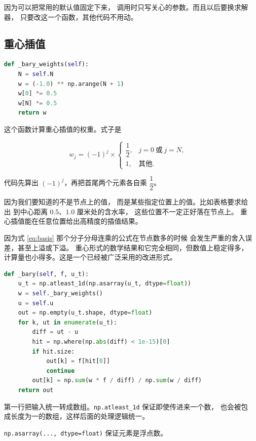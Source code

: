 因为可以把常用的默认值固定下来，
调用时只写关心的参数。而且以后要换求解器，
只要改这一个函数，其他代码不用动。

\subsection{重心插值}

\begin{lstlisting}[language=Python]
def _bary_weights(self):
    N = self.N
    w = (-1.0) ** np.arange(N + 1)
    w[0] *= 0.5
    w[N] *= 0.5
    return w
\end{lstlisting}

这个函数计算重心插值的权重。式子是

\begin{equation}
w_j = (-1)^j\times
\begin{cases}
\dfrac{1}{2}, & j=0\ \text{或}\ j=N,\\[4pt]
1, & \text{其他}.
\end{cases}
\end{equation}

代码先算出 $(-1)^j$，再把首尾两个元素各自乘 $\dfrac{1}{2}$。

因为我们要知道的不是节点上的值，
而是某些指定位置上的值。比如表格要求给出
到中心距离 $0.5$、$1.0$ 厘米处的含水率，
这些位置不一定正好落在节点上。
重心插值能在任意位置给出高精度的插值结果。

因为式 \eqref{eq:basis} 那个分子分母连乘的公式在节点数多的时候
会发生严重的舍入误差，甚至上溢或下溢。
重心形式的数学结果和它完全相同，但数值上稳定得多，
计算量也小得多。这是一个已经被广泛采用的改进形式。

\begin{lstlisting}[language=Python]
def _bary(self, f, u_t):
    u_t = np.atleast_1d(np.asarray(u_t, dtype=float))
    w = self._bary_weights()
    u = self.u
    out = np.empty(u_t.shape, dtype=float)
    for k, ut in enumerate(u_t):
        diff = ut - u
        hit = np.where(np.abs(diff) < 1e-15)[0]
        if hit.size:
            out[k] = f[hit[0]]
            continue
        out[k] = np.sum(w * f / diff) / np.sum(w / diff)
    return out
\end{lstlisting}

第一行把输入统一转成数组。\texttt{np.atleast\_1d} 保证即使传进来一个数，
也会被包成长度为一的数组，这样后面的处理逻辑统一。

\texttt{np.asarray(..., dtype=float)} 保证元素是浮点数。

